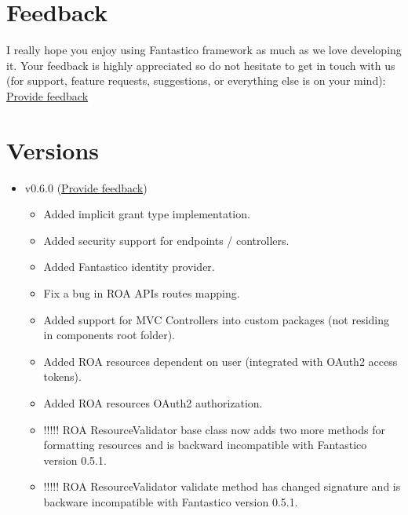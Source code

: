\documentclass[letterpaper,10pt,english]{sphinxmanual}
\begin{document}
\section{Feedback}
\label{changes:feedback}
I really hope you enjoy using Fantastico framework as much as we love developing it. Your feedback is highly appreciated
so do not hesitate to get in touch with us (for support, feature requests, suggestions, or everything else is on your mind):
\href{https://docs.google.com/forms/d/1tKBopU3lfDB\_w8F4h7Rl1Rn4uydAJq-nha09L\_ptJck/edit?usp=sharing}{Provide feedback}


\section{Versions}
\label{changes:versions}\begin{itemize}
\item {} 
v0.6.0 (\href{https://docs.google.com/forms/d/1tKBopU3lfDB\_w8F4h7Rl1Rn4uydAJq-nha09L\_ptJck/edit?usp=sharing}{Provide feedback})
\begin{itemize}
\item {} 
Added implicit grant type implementation.

\item {} 
Added security support for endpoints / controllers.

\item {} 
Added Fantastico identity provider.

\item {} 
Fix a bug in ROA APIs routes mapping.

\item {} 
Added support for MVC Controllers into custom packages (not residing in components root folder).

\item {} 
Added ROA resources dependent on user (integrated with OAuth2 access tokens).

\item {} 
Added ROA resources OAuth2 authorization.

\item {} 
!!!!! ROA ResourceValidator base class now adds two more methods for formatting resources and is backward incompatible with Fantastico version 0.5.1.

\item {} 
!!!!! ROA ResourceValidator validate method has changed signature and is backware incompatible with Fantastico version 0.5.1.

\end{itemize}


\end{itemize}
\end{document}
